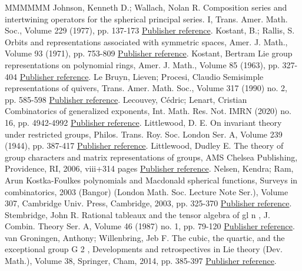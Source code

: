 \documentclass[11pt]{article}
\theoremstyle{definition}
\numberwithin{equation}{section}
\begin{document}
\begin{thebibliography}{MMMMMM}
 Johnson, Kenneth D.; Wallach, Nolan R. Composition series and intertwining operators for the spherical principal series. I, Trans. Amer. Math. Soc., Volume 229 (1977), pp. 137-173 \href{https://alco.centre-mersenne.org/articles/10.5802/alco.391/#JohnsonWallach1977}{Publisher reference}.
 Kostant, B.; Rallis, S. Orbits and representations associated with symmetric spaces, Amer. J. Math., Volume 93 (1971), pp. 753-809 \href{https://alco.centre-mersenne.org/articles/10.5802/alco.391/#KostantRallis1971}{Publisher reference}.
 Kostant, Bertram Lie group representations on polynomial rings, Amer. J. Math., Volume 85 (1963), pp. 327-404 \href{https://alco.centre-mersenne.org/articles/10.5802/alco.391/#Kostant1963}{Publisher reference}.
 Le Bruyn, Lieven; Procesi, Claudio Semisimple representations of quivers, Trans. Amer. Math. Soc., Volume 317 (1990) no. 2, pp. 585-598 \href{https://alco.centre-mersenne.org/articles/10.5802/alco.391/#LeBryunProcesi1990}{Publisher reference}.
 Lecouvey, Cédric; Lenart, Cristian Combinatorics of generalized exponents, Int. Math. Res. Not. IMRN (2020) no. 16, pp. 4942-4992 \href{https://alco.centre-mersenne.org/articles/10.5802/alco.391/#LecouveyLenart2020}{Publisher reference}.
 Littlewood, D. E. On invariant theory under restricted groups, Philos. Trans. Roy. Soc. London Ser. A, Volume 239 (1944), pp. 387-417 \href{https://alco.centre-mersenne.org/articles/10.5802/alco.391/#Littlewood1944}{Publisher reference}.
 Littlewood, Dudley E. The theory of group characters and matrix representations of groups, AMS Chelsea Publishing, Providence, RI, 2006, viii+314 pages \href{https://alco.centre-mersenne.org/articles/10.5802/alco.391/#Littlewood1945}{Publisher reference}.
 Nelsen, Kendra; Ram, Arun Kostka-Foulkes polynomials and Macdonald spherical functions, Surveys in combinatorics, 2003 (Bangor) (London Math. Soc. Lecture Note Ser.), Volume 307, Cambridge Univ. Press, Cambridge, 2003, pp. 325-370 \href{https://alco.centre-mersenne.org/articles/10.5802/alco.391/#NelsenRam2003}{Publisher reference}.
 Stembridge, John R. Rational tableaux and the tensor algebra of  gl  n , J. Combin. Theory Ser. A, Volume 46 (1987) no. 1, pp. 79-120 \href{https://alco.centre-mersenne.org/articles/10.5802/alco.391/#STEMBRIDGE198779}{Publisher reference}.
 van Groningen, Anthony; Willenbring, Jeb F. The cubic, the quartic, and the exceptional group G 2 , Developments and retrospectives in Lie theory (Dev. Math.), Volume 38, Springer, Cham, 2014, pp. 385-397 \href{https://alco.centre-mersenne.org/articles/10.5802/alco.391/#WillenbringVanGroningen2014}{Publisher reference}.

\end{thebibliography}
\end{document}
